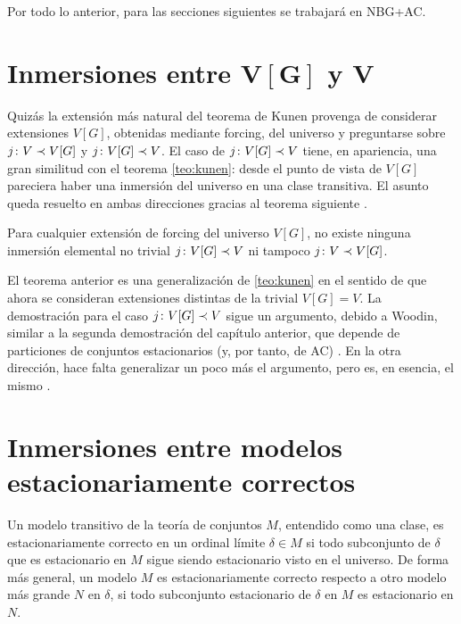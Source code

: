 Por todo lo anterior, para las secciones siguientes se trabajará en NBG+AC.

\section{Inmersiones entre $\symbf{V[G]}$ y $\symbf{V}$}

Quizás la extensión más natural del teorema de Kunen provenga de considerar
extensiones $V[G]$, obtenidas mediante forcing, del universo y preguntarse sobre
$j\colon V\prec V[G]$ y $j\colon V[G]\prec V$.
El caso de $j\colon V[G]\prec V$ tiene, en apariencia, una gran similitud con
el teorema \ref{teo:kunen}: desde el punto de vista de $V[G]$ pareciera
haber una inmersión del universo en una clase transitiva.
El asunto queda resuelto en ambas direcciones gracias al teorema siguiente
\autocite[Teoremas 5 y 7]{hamkins_generalizations_2012}.

\begin{teo}\label{teo:kunen-forcing}
    Para cualquier extensión de forcing del universo $V[G]$,
    no existe ninguna inmersión elemental no trivial $j\colon V[G]\prec V$
    ni tampoco $j\colon V\prec V[G]$.
\end{teo}

El teorema anterior es una generalización de \ref{teo:kunen}
en el sentido de que ahora se consideran extensiones distintas de la trivial $V[G]=V$.
La demostración para el caso $j\colon V[G]\prec V$ sigue un argumento,
debido a Woodin, similar a la segunda demostración del capítulo anterior,
que depende de particiones de conjuntos estacionarios (y, por tanto, de AC)
\autocite[1876]{hamkins_generalizations_2012}.
En la otra dirección, hace falta generalizar un poco más el argumento, pero es, en esencia,
el mismo \autocite[1877]{hamkins_generalizations_2012}.

\section{Inmersiones entre modelos estacionariamente correctos}

Un modelo transitivo de la teoría de conjuntos $M$, entendido como una clase,
es estacionariamente correcto en un ordinal límite $\delta\in M$ si todo subconjunto
de $\delta$ que es estacionario en $M$ sigue siendo estacionario visto en el universo.
De forma más general, un modelo $M$ es estacionariamente correcto respecto a otro modelo
más grande $N$ en $\delta$, si todo subconjunto estacionario de $\delta$ en $M$ es estacionario en $N$.

